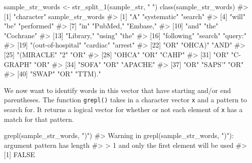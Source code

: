 \documentclass[
  letterpaper,
]{latex/krantz}
\makeatletter
\newenvironment{Shaded}{\begin{snugshade}}{\end{snugshade}}
\newcommand{\CommentTok}[1]{\textcolor[rgb]{0.37,0.37,0.37}{#1}}
\newcommand{\FunctionTok}[1]{\textcolor[rgb]{0.28,0.35,0.67}{#1}}
\newcommand{\NormalTok}[1]{\textcolor[rgb]{0.00,0.23,0.31}{#1}}
\newcommand{\OtherTok}[1]{\textcolor[rgb]{0.00,0.23,0.31}{#1}}
\newcommand{\StringTok}[1]{\textcolor[rgb]{0.13,0.47,0.30}{#1}}
\newenvironment{kframe}{%
\medskip{}
\setlength{\fboxsep}{.8em}
 \def\at@end@of@kframe{}%
 \ifinner\ifhmode%
  \def\at@end@of@kframe{\end{minipage}}%
  \begin{minipage}{\columnwidth}%
 \fi\fi%
 \def\FrameCommand##1{\hskip\@totalleftmargin \hskip-\fboxsep
 \colorbox{shadecolor}{##1}\hskip-\fboxsep
     \hskip-\linewidth \hskip-\@totalleftmargin \hskip\columnwidth}%
 \MakeFramed {\advance\hsize-\width
   \@totalleftmargin\z@ \linewidth\hsize
   \@setminipage}}%
 {\par\unskip\endMakeFramed%
 \at@end@of@kframe}
\renewenvironment{Shaded}{\begin{kframe}}{\end{kframe}}
\makeatother
\begin{document}
\begin{Shaded}
\begin{Highlighting}[]
\NormalTok{sample\_str\_words }\OtherTok{\textless{}{-}} \FunctionTok{str\_split\_1}\NormalTok{(sample\_str, }\StringTok{" "}\NormalTok{)}
\FunctionTok{class}\NormalTok{(sample\_str\_words)}
\CommentTok{\#\textgreater{} [1] "character"}
\NormalTok{sample\_str\_words}
\CommentTok{\#\textgreater{}  [1] "A"                 "systematic"        "search"           }
\CommentTok{\#\textgreater{}  [4] "will"              "be"                "performed"        }
\CommentTok{\#\textgreater{}  [7] "in"                "PubMed,"           "Embase,"          }
\CommentTok{\#\textgreater{} [10] "and"               "the"               "Cochrane"         }
\CommentTok{\#\textgreater{} [13] "Library,"          "using"             "the"              }
\CommentTok{\#\textgreater{} [16] "following"         "search"            "query:"           }
\CommentTok{\#\textgreater{} [19] "(\textquotesingle{}out{-}of{-}hospital" "cardiac"           "arrest\textquotesingle{}"          }
\CommentTok{\#\textgreater{} [22] "OR"                "\textquotesingle{}OHCA\textquotesingle{})"           "AND"              }
\CommentTok{\#\textgreater{} [25] "(\textquotesingle{}MIRACLE"         "2\textquotesingle{}"                "OR"               }
\CommentTok{\#\textgreater{} [28] "\textquotesingle{}OHCA\textquotesingle{}"            "OR"                "\textquotesingle{}CAHP\textquotesingle{}"           }
\CommentTok{\#\textgreater{} [31] "OR"                "\textquotesingle{}C{-}GRAPH\textquotesingle{}"         "OR"               }
\CommentTok{\#\textgreater{} [34] "\textquotesingle{}SOFA\textquotesingle{}"            "OR"                "\textquotesingle{}APACHE\textquotesingle{}"         }
\CommentTok{\#\textgreater{} [37] "OR"                "\textquotesingle{}SAPS’"            "OR"               }
\CommentTok{\#\textgreater{} [40] "\textquotesingle{}SWAP\textquotesingle{}"            "OR"                "\textquotesingle{}TTM\textquotesingle{})."}
\end{Highlighting}
\end{Shaded}

We now want to identify words in this vector that have starting and/or
end parentheses. The function \texttt{grepl()}
 takes in a character vector
\texttt{x} and a pattern to search for. It returns a logical vector for
whether or not each element of \texttt{x} has a match for that pattern.

\begin{Shaded}
\begin{Highlighting}[]
\FunctionTok{grepl}\NormalTok{(sample\_str\_words, }\StringTok{")"}\NormalTok{)}
\CommentTok{\#\textgreater{} Warning in grepl(sample\_str\_words, ")"): argument \textquotesingle{}pattern\textquotesingle{} has length}
\CommentTok{\#\textgreater{} \textgreater{} 1 and only the first element will be used}
\CommentTok{\#\textgreater{} [1] FALSE}
\end{Highlighting}
\end{Shaded}
\end{document}
